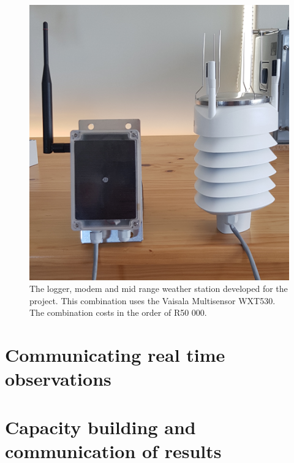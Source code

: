 \documentclass{wrcreport}
\begin{document}
\begin{figure}[!htp]
  \begin{center}
    \includegraphics[width=\textwidth]{vaisala-wxt530.jpg}
  \end{center}
  \caption[The logger, modem and mid range weather station developed for the project.]{The logger, modem and mid range weather station developed for the project. This combination uses the Vaisala Multisensor WXT530. The combination costs in the order of R50 000.}
\label{fig:logger3}
\end{figure}

\chapter{Communicating real time observations}
\label{chap:cumminicating}

\chapter[Capacity building and communication]{Capacity building and communication of results}
\label{chap:capacity}
\end{document}

